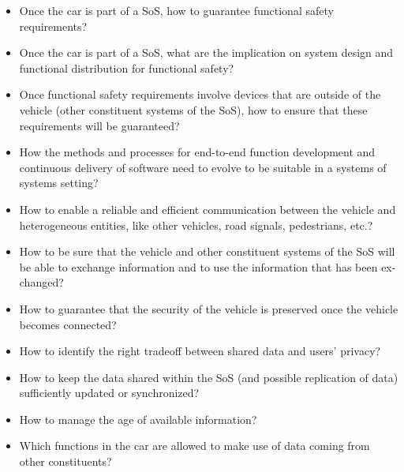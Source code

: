 \begin{itemize}
\item Once the car is part of a SoS, how to guarantee functional safety requirements?
\item Once the car is part of a SoS, what are the implication on system design and functional distribution for functional safety?
\item Once functional safety requirements involve devices that are outside of the vehicle (other constituent systems of the SoS), how to ensure that these requirements will be guaranteed?
\item How the methods and processes for end-to-end function development and continuous delivery of software need to evolve to be suitable in a systems of systems setting?
\item How to enable a reliable and efficient communication between the vehicle and heterogeneous entities, like other vehicles, road signals, pedestrians, etc.?
\item How to be sure that the vehicle and other constituent systems of the SoS will be able to exchange information and to use the information that has been ex-changed?
\item How to guarantee that the security of the vehicle is preserved once the vehicle becomes connected?
\item How to identify the right tradeoff between shared data and users' privacy?
\item How to keep the data shared within the SoS (and possible replication of data) sufficiently updated or synchronized?
\item How to manage the age of available information?
\item Which functions in the car are allowed to make use of data coming from other constituents?
\end{itemize}



